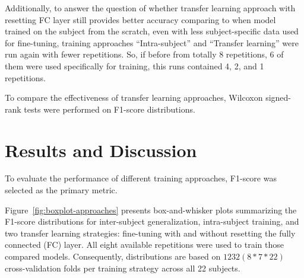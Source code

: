 Additionally, to answer the question of whether transfer learning approach with resetting FC layer still provides better accuracy comparing to when model trained on the subject from the scratch, even with less subject-specific data used for fine-tuning, training approaches ``Intra-subject'' and ``Transfer learning'' were run again with fewer repetitions. So, if before from totally 8 repetitions, 6 of them were used specifically for training, this runs contained 4, 2, and 1 repetitions.

To compare the effectiveness of transfer learning approaches, Wilcoxon signed-rank tests were performed on F1-score distributions.

\section{Results and Discussion}

To evaluate the performance of different training approaches, F1-score was selected as the primary metric.

Figure~\ref{fig:boxplot-approaches} presents box-and-whisker plots summarizing the F1-score distributions for inter-subject generalization, intra-subject training, and two transfer learning strategies: fine-tuning with and without resetting the fully connected (FC) layer. All eight available repetitions were used to train those compared models. Consequently, distributions are based on $1232 (8*7*22)$ cross-validation folds per training strategy across all 22 subjects.

